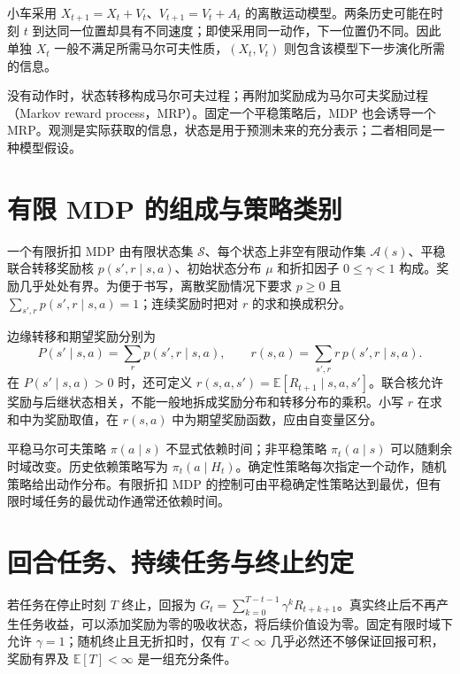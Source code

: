 \documentclass[UTF8,12pt,a4paper,fontset=fandol]{ctexbook}
\begin{document}
\begin{example}[位置为何可能不是状态]
小车采用 $X_{t+1}=X_t+V_t$、$V_{t+1}=V_t+A_t$ 的离散运动模型。两条历史可能在时刻 $t$ 到达同一位置却具有不同速度；即使采用同一动作，下一位置仍不同。因此单独 $X_t$ 一般不满足所需马尔可夫性质，$(X_t,V_t)$ 则包含该模型下一步演化所需的信息。
\end{example}

没有动作时，状态转移构成马尔可夫过程；再附加奖励成为马尔可夫奖励过程（Markov reward process，MRP）。固定一个平稳策略后，MDP 也会诱导一个 MRP。观测是实际获取的信息，状态是用于预测未来的充分表示；二者相同是一种模型假设。

\section{有限 MDP 的组成与策略类别}

\begin{definition}
一个有限折扣 MDP 由有限状态集 $\mathcal S$、每个状态上非空有限动作集 $\mathcal A(s)$、平稳联合转移奖励核 $p(s',r\mid s,a)$、初始状态分布 $\mu$ 和折扣因子 $0\leq\gamma<1$ 构成。奖励几乎处处有界。为便于书写，离散奖励情况下要求 $p\geq0$ 且 $\sum_{s',r}p(s',r\mid s,a)=1$；连续奖励时把对 $r$ 的求和换成积分。
\end{definition}

边缘转移和期望奖励分别为
\[
P(s'\mid s,a)=\sum_r p(s',r\mid s,a),\qquad
r(s,a)=\sum_{s',r}r\,p(s',r\mid s,a).
\]
在 $P(s'\mid s,a)>0$ 时，还可定义 $r(s,a,s')=\mathbb E[R_{t+1}\mid s,a,s']$。联合核允许奖励与后继状态相关，不能一般地拆成奖励分布和转移分布的乘积。小写 $r$ 在求和中为奖励取值，在 $r(s,a)$ 中为期望奖励函数，应由自变量区分。

平稳马尔可夫策略 $\pi(a\mid s)$ 不显式依赖时间；非平稳策略 $\pi_t(a\mid s)$ 可以随剩余时域改变。历史依赖策略写为 $\pi_t(a\mid H_t)$。确定性策略每次指定一个动作，随机策略给出动作分布。有限折扣 MDP 的控制可由平稳确定性策略达到最优，但有限时域任务的最优动作通常还依赖时间。

\section{回合任务、持续任务与终止约定}

若任务在停止时刻 $T$ 终止，回报为 $G_t=\sum_{k=0}^{T-t-1}\gamma^kR_{t+k+1}$。真实终止后不再产生任务收益，可以添加奖励为零的吸收状态，将后续价值设为零。固定有限时域下允许 $\gamma=1$；随机终止且无折扣时，仅有 $T<\infty$ 几乎必然还不够保证回报可积，奖励有界及 $\mathbb E[T]<\infty$ 是一组充分条件。
\end{document}
